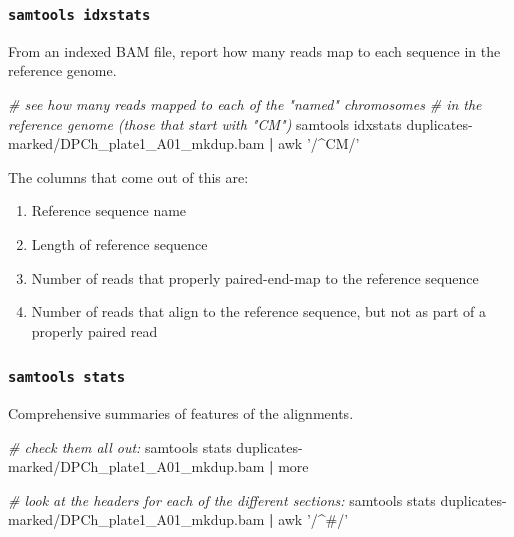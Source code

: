 \documentclass[]{krantz}
\makeatletter
\newenvironment{Shaded}{\begin{snugshade}}{\end{snugshade}}
\newcommand{\CommentTok}[1]{\textcolor[rgb]{0.37,0.37,0.37}{\textit{#1}}}
\newcommand{\ExtensionTok}[1]{#1}
\newcommand{\FunctionTok}[1]{\textcolor[rgb]{0,0,0}{#1}}
\newcommand{\KeywordTok}[1]{\textcolor[rgb]{0.27,0.27,0.27}{\textbf{#1}}}
\newcommand{\NormalTok}[1]{#1}
\newcommand{\StringTok}[1]{\textcolor[rgb]{0.5,0.5,0.5}{#1}}
\providecommand{\tightlist}{%
  \setlength{\itemsep}{0pt}\setlength{\parskip}{0pt}}
\newenvironment{kframe}{%
\medskip{}
\setlength{\fboxsep}{.8em}
 \def\at@end@of@kframe{}%
 \ifinner\ifhmode%
  \def\at@end@of@kframe{\end{minipage}}%
  \begin{minipage}{\columnwidth}%
 \fi\fi%
 \def\FrameCommand##1{\hskip\@totalleftmargin \hskip-\fboxsep
 \colorbox{shadecolor}{##1}\hskip-\fboxsep
     \hskip-\linewidth \hskip-\@totalleftmargin \hskip\columnwidth}%
 \MakeFramed {\advance\hsize-\width
   \@totalleftmargin\z@ \linewidth\hsize
   \@setminipage}}%
 {\par\unskip\endMakeFramed%
 \at@end@of@kframe}
\renewenvironment{Shaded}{\begin{kframe}}{\end{kframe}}
\makeatother
\begin{document}
\hypertarget{samtools-idxstats}{%
\subsubsection{\texorpdfstring{\texttt{samtools\ idxstats}}{samtools idxstats}}\label{samtools-idxstats}}

From an indexed BAM file, report how many reads map to each
sequence in the reference genome.

\begin{Shaded}
\begin{Highlighting}[]
\CommentTok{# see how many reads mapped to each of the "named" chromosomes}
\CommentTok{# in the reference genome (those that start with "CM")}
\ExtensionTok{samtools}\NormalTok{ idxstats duplicates-marked/DPCh_plate1_A01_mkdup.bam }\KeywordTok{|} \FunctionTok{awk} \StringTok{'/^CM/'}
\end{Highlighting}
\end{Shaded}

The columns that come out of this are:

\begin{enumerate}
\def\labelenumi{\arabic{enumi}.}
\tightlist
\item
  Reference sequence name
\item
  Length of reference sequence
\item
  Number of reads that properly paired-end-map to the reference sequence
\item
  Number of reads that align to the reference sequence, but not as part of a properly paired read
\end{enumerate}

\hypertarget{samtools-stats}{%
\subsubsection{\texorpdfstring{\texttt{samtools\ stats}}{samtools stats}}\label{samtools-stats}}

Comprehensive summaries of features of the alignments.

\begin{Shaded}
\begin{Highlighting}[]
\CommentTok{# check them all out:}
\ExtensionTok{samtools}\NormalTok{ stats duplicates-marked/DPCh_plate1_A01_mkdup.bam }\KeywordTok{|} \FunctionTok{more}

\CommentTok{# look at the headers for each of the different sections:}
\ExtensionTok{samtools}\NormalTok{ stats duplicates-marked/DPCh_plate1_A01_mkdup.bam }\KeywordTok{|} \FunctionTok{awk} \StringTok{'/^#/'}
\end{Highlighting}
\end{Shaded}
\end{document}
